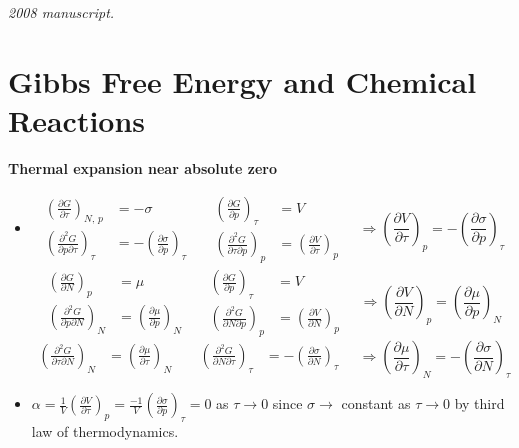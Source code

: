 \noindent\textit{2008 manuscript.}

\section{Gibbs Free Energy and Chemical Reactions}

 \textbf{Thermal expansion near absolute zero} \begin{itemize}
\item[(a)] \[
\begin{aligned}
  \left( \frac{ \partial G}{ \partial \tau} \right)_{N, \, p } & = - \sigma \\ 
  \left( \frac{ \partial^2 G}{ \partial p \partial \tau} \right)_{\tau}  & = - \left( \frac{ \partial \sigma}{ \partial p } \right)_{\tau}
\end{aligned} \quad \, \begin{aligned} \left( \frac{ \partial G }{ \partial p } \right)_{\tau} & = V \\ \left( \frac{ \partial^2 G}{ \partial \tau \partial p } \right)_p  & =\left( \frac{ \partial V}{ \partial \tau} \right)_p  \end{aligned} \quad \Longrightarrow \boxed{ \left( \frac{ \partial V}{ \partial \tau} \right)_p = -\left( \frac{ \partial \sigma }{ \partial p } \right)_{\tau} }
\]
\[
\begin{aligned}
  \left( \frac{ \partial G}{ \partial N} \right)_{ p } & =  \mu \\ 
  \left( \frac{ \partial^2 G}{ \partial p \partial N} \right)_{N}  & =  \left( \frac{ \partial \mu}{ \partial p } \right)_{N}
\end{aligned} \quad \, \begin{aligned} \left( \frac{ \partial G }{ \partial p } \right)_{\tau} & = V \\ \left( \frac{ \partial^2 G}{ \partial N \partial p } \right)_p  & =\left( \frac{ \partial V}{ \partial N} \right)_p  \end{aligned} \quad \Longrightarrow \boxed{ \left( \frac{ \partial V}{ \partial N} \right)_p = \left( \frac{ \partial \mu }{ \partial p } \right)_{N} }
\]
\[
\begin{aligned}
  \left( \frac{ \partial^2 G}{ \partial \tau \partial N} \right)_{N}  & =  \left( \frac{ \partial \mu}{ \partial \tau } \right)_{N}
\end{aligned} \quad \, \begin{aligned} 
\left( \frac{ \partial^2 G}{ \partial N \partial \tau } \right)_\tau  & = - \left( \frac{ \partial \sigma}{ \partial N} \right)_{\tau}  \end{aligned} \quad \Longrightarrow \boxed{ \left( \frac{ \partial \mu}{ \partial \tau } \right)_N = -\left( \frac{ \partial \sigma }{ \partial N } \right)_{\tau} }
\]
\item[(b)] $\alpha = \frac{1}{V} \left( \frac{ \partial V}{ \partial \tau} \right)_p = \frac{-1}{V} \left( \frac{ \partial \sigma }{ \partial p } \right)_{\tau} = 0$ as $\tau \to 0$ since $\sigma \to $ constant as $\tau \to 0$ by third law of thermodynamics.  
\end{itemize}

